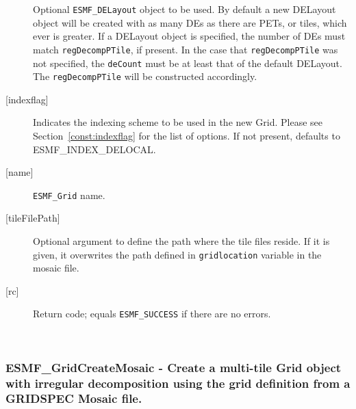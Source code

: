 \begin{description}
            Optional {\tt ESMF\_DELayout} object to be used. By default a new
            DELayout object will be created with as many DEs as there are PETs,
            or tiles, which ever is greater. If a DELayout object is specified,
            the number of DEs must match {\tt regDecompPTile}, if present. In the
            case that {\tt regDecompPTile} was not specified, the {\tt deCount}
            must be at least that of the default DELayout. The
            {\tt regDecompPTile} will be constructed accordingly.
       \item[{[indexflag]}]
            Indicates the indexing scheme to be used in the new Grid. Please see
            Section~\ref{const:indexflag} for the list of options. If not present,
            defaults to ESMF\_INDEX\_DELOCAL.
       \item[{[name]}]
            {\tt ESMF\_Grid} name.
       \item[{[tileFilePath]}]
            Optional argument to define the path where the tile files reside. If it
            is given, it overwrites the path defined in {\tt gridlocation} variable
            in the mosaic file.
       \item[{[rc]}]
            Return code; equals {\tt ESMF\_SUCCESS} if there are no errors.
       \end{description}
   
 
\mbox{}\hrulefill\ 
 
\subsubsection [ESMF\_GridCreateMosaic] {ESMF\_GridCreateMosaic - Create a multi-tile Grid object with irregular decomposition using the grid definition from a GRIDSPEC Mosaic file.}


